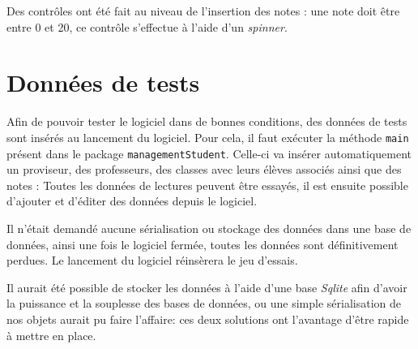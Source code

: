\documentclass[a4paper, 11pt]{article}
\begin{document}
	Des contrôles ont été fait au niveau de l'insertion des notes : une note doit être entre 0 et 20, ce contrôle s'effectue à l'aide d'un \textit{spinner}.
	\section{Données de tests}
	Afin de pouvoir tester le logiciel dans de bonnes conditions, des données de tests sont insérés au lancement du logiciel. Pour cela, il faut
	exécuter la méthode \texttt{main} présent dans le package \texttt{managementStudent}. Celle-ci va insérer automatiquement un proviseur, des
	professeurs, des classes avec leurs élèves associés ainsi que des notes : Toutes les données de lectures peuvent être essayés, il est ensuite
	possible d'ajouter et d'éditer des données depuis le logiciel.

	\begin{remarque}
		Il n'était demandé aucune sérialisation ou stockage des données dans une base de données, ainsi une fois le logiciel fermée, toutes les données
		sont définitivement perdues. Le lancement du logiciel réinsèrera le jeu d'essais.

		Il aurait été possible de stocker les données à l'aide d'une base \textit{Sqlite} afin d'avoir la puissance et la souplesse des bases de
		données, ou une simple sérialisation de nos objets aurait pu faire l'affaire: ces deux solutions ont l'avantage d'être rapide à mettre en place.
	\end{remarque}
\end{document}
